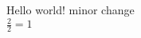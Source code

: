 \documentclass[12pt,a4paper]{article}
\begin{document}
Hello world! minor change
\\
$\frac{2}{2} = 1$ %
\end{document}
